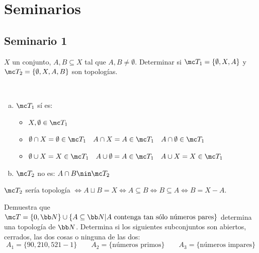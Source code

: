 \chapter{Seminarios} \justifying
\section{Seminario 1}
\begin{ejer}
    [1]
\end{ejer}
\begin{ejer}
    [2] $X$ un conjunto, $A,B \subseteq X$ tal que $A,B \neq \emptyset$. Determinar si $\mc T_1 = \{\emptyset, X, A\}$ y $\mc T_2 = \{\emptyset, X, A, B\}$ son topolog\'ias. 
\end{ejer}
\begin{sol}\, 
   \begin{enumerate}[a)]
    \item $\mc T_1$ s\'i es:
    \begin{itemize}
        \item $X, \emptyset \in \mc T_1$
        \item $\emptyset\cap X = \emptyset \in \mc T_1 \quad A\cap X = A \in \mc T_1 \quad A \cap \emptyset \in \mc T_1$
        \item  $\emptyset\cup X =X \in \mc T_1\quad A \cup \emptyset = A \in \mc T_1 \quad A\cup X = X \in \mc T_1 $
    \end{itemize}
    \item $\mc T_2$ no es: $A\cap B \nin \mc T_2$
   \end{enumerate} 
   $\mc T_2$ ser\'ia topolog\'ia $\iff A\sqcup B = X \iff A\subseteq B \iff B\subseteq A \iff B = X-A$.
\end{sol}
\begin{ejer}
    [3] Demuestra que $\mc T = \{0,\bb N\} \cup \{A \subseteq \bb N | A \text{ contenga tan sólo números pares}\}$ determina una topología de $\bb N$. Determina si los siguientes subconjuntos son abiertos, cerrados, las dos cosas o ninguna de las dos:
    $$ A_1 = \{90,210,521 -1\}\qquad  A_2 = \{\text{números primos}\} \qquad  A_3 = \{\text{números impares}\}$$
\end{ejer}
